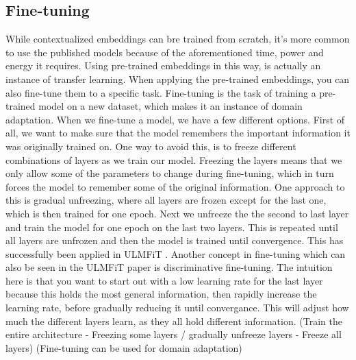 \documentclass{report}
\begin{document}
\subsection{Fine-tuning}
While contextualized embeddings can bre trained from scratch, it's more common to use the published models because of the aforementioned time, power and energy it requires. Using pre-trained embeddings in this way, is actually an instance of transfer learning. When applying the pre-trained embeddings, you can also fine-tune them to a specific task. Fine-tuning is the task of training a pre-trained model on a new dataset, which makes it an instance of domain adaptation. When we fine-tune a model, we have a few different options. First of all, we want to make sure that the model remembers the important information it was originally trained on. One way to avoid this, is to freeze different combinations of layers as we train our model. Freezing the layers means that we only allow some of the parameters to change during fine-tuning, which in turn forces the model to remember some of the original information. One approach to this is gradual unfreezing, where all layers are frozen except for the last one, which is then trained for one epoch. Next we unfreeze the the second to last layer and train the model for one epoch on the last two layers. This is repeated until all layers are unfrozen and then the model is trained until convergence. This has successfully been applied in ULMFiT \cite{howard-ruder-2018-universal}. Another concept in fine-tuning which can also be seen in the ULMFiT paper is discriminative fine-tuning. The intuition here is that you want to start out with a low learning rate for the last layer because this holds the most general information, then rapidly increase the learning rate, before gradually reducing it until convergance. This will adjust how much the different layers learn, as they all hold different information. (Train the entire architecture - Freezing some layers / gradually unfreeze layers - Freeze all layers) (Fine-tuning can be used for domain adaptation)







\newpage


\end{document}
